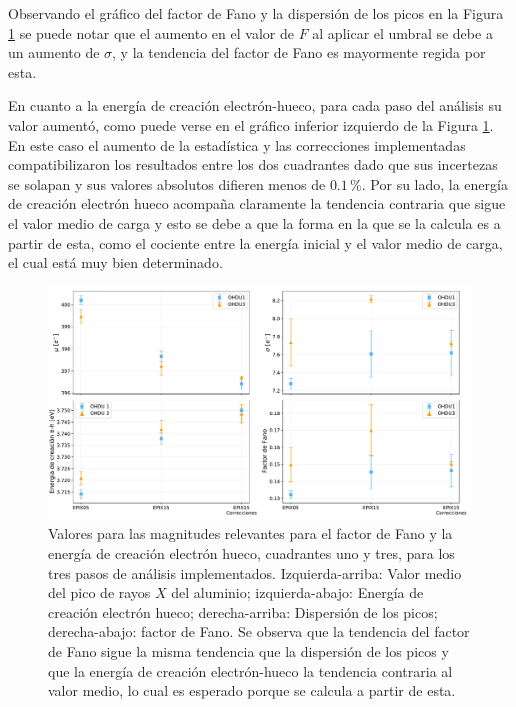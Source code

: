 Observando el gráfico del factor de Fano y la dispersión de los picos en la Figura \ref{fig:Al_mu_sigma_fano_eh} se puede notar que el aumento en el valor de $F$ al aplicar el umbral se debe a un aumento de $\sigma$, %
y la tendencia del factor de Fano es mayormente regida por esta.

En cuanto a la energía de creación electrón-hueco, para cada paso del análisis su valor aumentó, como puede verse en el gráfico inferior izquierdo de la Figura \ref{fig:Al_mu_sigma_fano_eh}. En este caso el aumento de la estadística y las correcciones implementadas compatibilizaron los resultados entre los dos cuadrantes dado que sus incertezas se solapan y sus valores absolutos difieren menos de $0.1\,\%$. Por su lado, la energía de creación electrón hueco acompaña claramente la tendencia contraria que sigue el valor medio de carga y esto se debe a que la forma en la que se la calcula es a partir de esta, como el cociente entre la energía inicial y el valor medio de carga, el cual está muy bien determinado.
\begin{figure}[h]
    \centering
        \includegraphics[scale=0.45]{Figs/Al_mu_sigma_fano_Eeh.pdf}
    \caption{Valores para las magnitudes relevantes para el factor de Fano y la energía de creación electrón hueco, cuadrantes uno y tres, para los tres pasos de análisis implementados. Izquierda-arriba: Valor medio del pico de rayos $X$ del aluminio; izquierda-abajo: Energía de creación electrón hueco; derecha-arriba: Dispersión de los picos; derecha-abajo: factor de Fano. Se observa que la tendencia del factor de Fano sigue la misma tendencia que la dispersión de los picos y que la energía de creación electrón-hueco la tendencia contraria al valor medio, lo cual es esperado porque se calcula a partir de esta.}
    \label{fig:Al_mu_sigma_fano_eh}
\end{figure}

